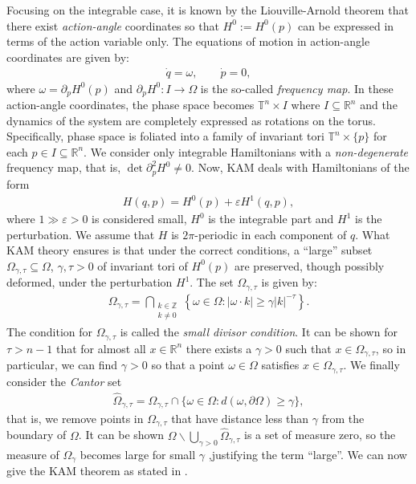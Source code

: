 Focusing on the integrable case, it is known by the Liouville-Arnold theorem that there exist \textit{action-angle} coordinates so that $H^0:=H^0(p)$ can be expressed in terms of the action variable only. The equations of motion in action-angle coordinates are given by:
\begin{align*}
\dot q = \omega, \qquad \dot p = 0,
\end{align*}
where $\omega = \partial_pH^0(p)$ and $\partial_p H^0:I\to\Omega$ is the so-called \textit{frequency map}. In these action-angle coordinates, the phase space becomes $\mathbb T^n\times I$ where $I\subseteq\mathbb R^n$ and the dynamics of the system are completely expressed as rotations on the torus. Specifically, phase space is foliated into a family of invariant tori $\mathbb T^n\times\{p\}$ for each $p\in I\subseteq \mathbb R^n$. We consider only integrable Hamiltonians with a \textit{non-degenerate} frequency map, that is, $\det\partial_p^2 H^0\neq 0$. Now, KAM deals with Hamiltonians of the form
\begin{align*}
H(q,p) = H^0(p) + \varepsilon H^1(q,p),
\end{align*}
where $1\gg\varepsilon>0$ is considered small, $H^0$ is the integrable part and $H^1$ is the perturbation. We assume that $H$ is $2\pi$-periodic in each component of $q$. What KAM theory ensures is that under the correct conditions, a ``large'' subset $\Omega_{\gamma,\tau}\subseteq\Omega$, $\gamma,\tau>0$ of invariant tori of $H^0(p)$ are preserved, though possibly deformed, under the perturbation $H^1$. The set $\Omega_{\gamma,\tau}$ is given by:
\begin{align}\label{eq:smalldivisorcondition}
\Omega_{\gamma,\tau} = \bigcap_{\substack{k\in\mathbb Z\\ k\neq 0}}\left\{ \omega\in\Omega :
|\omega \cdot k| \ge \gamma|k|^{-\tau}\right\}.
\end{align}
The condition for $\Omega_{\gamma,\tau}$ is called the \textit{small divisor condition}. It can be shown for $\tau>n-1$ that for almost all $x\in\mathbb R^n$ there exists a $\gamma>0$ such that $x\in\Omega_{\gamma,\tau}$, so in particular, we can find $\gamma>0$ so that a point $\omega\in\Omega$ satisfies $x\in \Omega_{\gamma,\tau}$. We finally consider the \textit{Cantor} set 
\begin{align*}
\hat\Omega_{\gamma,\tau}= \Omega_{\gamma,\tau}\cap\{\omega\in\Omega: d(\omega,\partial\Omega)\ge\gamma\},
\end{align*}
that is, we remove points in $\Omega_{\gamma,\tau}$ that have distance less than $\gamma$ from the boundary of $\Omega$. It can be shown $\Omega\backslash \bigcup_{\gamma>0}\hat\Omega_{\gamma,\tau}$ is a set of measure zero, so the measure of $\Omega_\gamma$ becomes large for small $\gamma$ ,justifying the term ``large''. We can now give the KAM theorem as stated in \cite{poschel82}.

